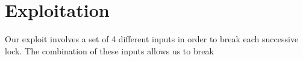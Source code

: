 \section{Exploitation}
Our exploit involves a set of 4 different inputs in order to break each successive lock. The combination of these inputs allows us to break 